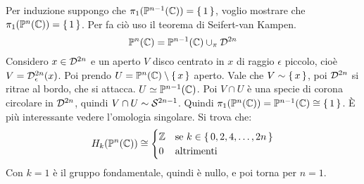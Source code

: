 Per induzione suppongo che $ \pi_1(\mathbb{P}^{n-1} (\mathbb{C})) = \set{1} $, voglio
mostrare che $ \pi_1(\mathbb{P}^{n} (\mathbb{C})) = \set{1} $. Per fa ciò
uso il teorema di Seifert-van Kampen.
\[
  \mathbb{P}^{n} (\mathbb{C}) = \mathbb{P}^{n-1} (\mathbb{C}) \cup_\pi \mathcal{D}^{2n}
\]
Considero $ x \in \mathcal{D}^{2n} $ e un aperto $ V $ disco centrato in $ x $
di raggio $ \epsilon $ piccolo, cioè $ V = \mathcal{D}^{2n}_\epsilon(x) $. Poi prendo
$ U = \mathbb{P}^{n} (\mathbb{C}) \setminus \set{x} $ aperto.
Vale che $ V \sim \set{x} $, poi $ \mathcal{D}^{2n} $ si ritrae al bordo, che
si attacca. $ U \simeq \mathbb{P}^{n-1} (\mathbb{C}) $.
Poi $ V \cap U $ è una specie di corona circolare in $ \mathcal{D}^{2n} $,
quindi $ V \cap U \sim \mathcal{S}^{2n -1} $. Quindi $ \pi_1(\mathbb{P}^{n} (\mathbb{C})) = \mathbb{P}^{n-1} (\mathbb{C}) \cong \set{1} $.
È più interessante vedere l'omologia singolare.
Si trova che:
\[
  H_k(\mathbb{P}^{n} (\mathbb{C})) \cong
  \begin{cases}
    \mathbb{Z} & \text{se } k \in \set{0,2,4,\dots, 2n} \\
    0 & \text{altrimenti}
  \end{cases}
\]
Con $ k = 1 $ è il gruppo fondamentale, quindi è nullo, e poi torna per $ n = 1 $.








